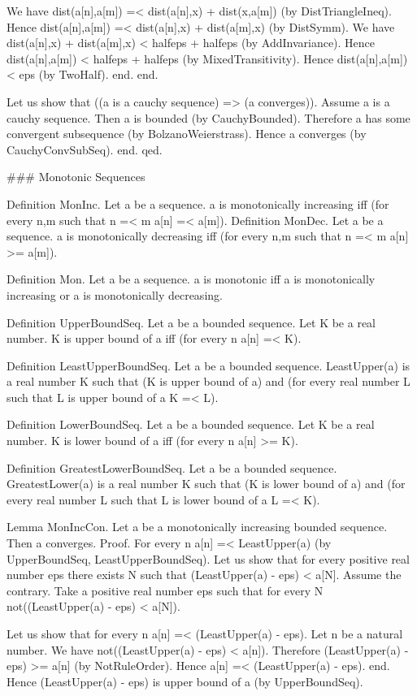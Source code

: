 \documentclass{article}
\newenvironment{forthel}{\begin{leftbar}}{\end{leftbar}}
\begin{document}
\begin{forthel}
	We have dist(a[n],a[m]) =< dist(a[n],x) + dist(x,a[m]) (by DistTriangleIneq).
	Hence dist(a[n],a[m]) =< dist(a[n],x) + dist(a[m],x) (by DistSymm).
	We have dist(a[n],x) + dist(a[m],x) < halfeps + halfeps (by AddInvariance).
	Hence dist(a[n],a[m]) < halfeps + halfeps (by MixedTransitivity).
	Hence dist(a[n],a[m]) < eps (by TwoHalf).
	end.
	end.
	
	Let us show that ((a is a cauchy sequence) => (a converges)).
	Assume a is a cauchy sequence.
	Then a is bounded (by CauchyBounded).
	Therefore a has some convergent subsequence (by BolzanoWeierstrass).
	Hence a converges (by CauchyConvSubSeq).
	end.
	qed.
	
	
	
	### Monotonic Sequences
	
	Definition MonInc.
	Let a be a sequence. a is monotonically increasing iff (for every n,m such that n =< m a[n] =< a[m]).
	Definition MonDec.
	Let a be a sequence. a is monotonically decreasing iff (for every n,m such that n =< m a[n] >= a[m]).
	
	Definition Mon.
	Let a be a sequence. a is monotonic iff a is monotonically increasing or a is monotonically decreasing.
	
	Definition UpperBoundSeq.
	Let a be a bounded sequence. Let K be a real number. K is upper bound of a iff (for every n a[n] =< K).
	
	Definition LeastUpperBoundSeq.
	Let a be a bounded sequence. LeastUpper(a) is a real number K such that (K is upper bound of a) and 
	(for every real number L such that L is upper bound of a K =< L).
	
	Definition LowerBoundSeq.
	Let a be a bounded sequence. Let K be a real number. K is lower bound of a iff (for every n a[n] >= K).
	
	Definition GreatestLowerBoundSeq.
	Let a be a bounded sequence. GreatestLower(a) is a real number K such that (K is lower bound of a) and
	(for every real number L such that L is lower bound of a L =< K).
	
	Lemma MonIncCon.
	Let a be a monotonically increasing bounded sequence. Then a converges.
	Proof.
	For every n a[n] =< LeastUpper(a) (by UpperBoundSeq, LeastUpperBoundSeq).
	Let us show that for every positive real number eps there exists N such that (LeastUpper(a) - eps) < a[N].
	Assume the contrary.
	Take a positive real number eps such that for every N not((LeastUpper(a) - eps) < a[N]).
	
	Let us show that for every n a[n] =< (LeastUpper(a) - eps).
	Let n be a natural number.
	We have not((LeastUpper(a) - eps) < a[n]).
	Therefore (LeastUpper(a) - eps) >= a[n] (by NotRuleOrder).
	Hence a[n] =< (LeastUpper(a) - eps).
	end.
	Hence (LeastUpper(a) - eps) is upper bound of a (by UpperBoundSeq).
	

\end{forthel}
\end{document}
